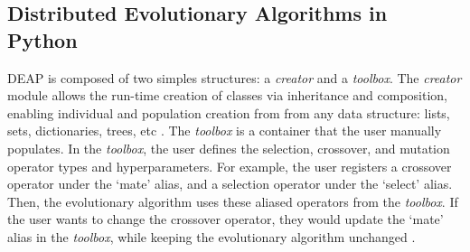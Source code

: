 \subsection{Distributed Evolutionary Algorithms in Python}
\label{sec:deap-works}
\gls{DEAP} is composed of two simples structures: a \textit{creator} and a 
\textit{toolbox}.  
The \textit{creator} module allows the run-time creation of classes via 
inheritance and composition, enabling individual and population creation from 
from any data structure: lists, sets, dictionaries, trees, etc \cite{fortin_deap_2012}. 
The \textit{toolbox} is a container that the user manually populates.
In the \textit{toolbox}, the user defines the selection, crossover, and 
mutation operator types and hyperparameters. 
For example, the user registers a crossover operator under the `mate'
alias, and a selection operator under the `select' alias. 
Then, the evolutionary algorithm uses these aliased operators from the 
\textit{toolbox}. 
If the user wants to change the crossover operator, they would update the 
`mate' alias in the \textit{toolbox}, while keeping the evolutionary algorithm 
unchanged \cite{fortin_deap_2012}. 

